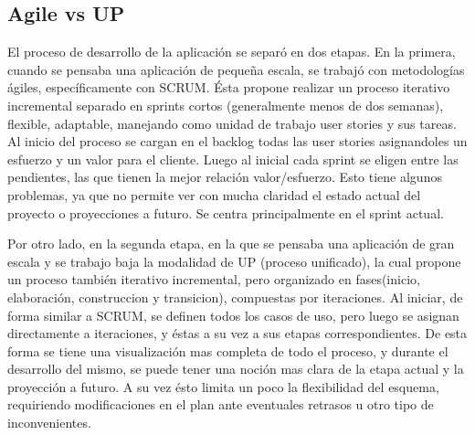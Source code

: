 \subsection{Agile vs UP}

El proceso de desarrollo de la aplicaci\'on se separ\'o en dos etapas. En la primera, cuando se pensaba una aplicaci\'on de peque\~na escala, se trabaj\'o con metodolog\'ias \'agiles, espec\'ificamente con SCRUM. Ésta propone realizar un proceso iterativo incremental separado en sprints cortos (generalmente menos de dos semanas), flexible, adaptable, manejando como unidad de trabajo user stories y sus tareas. Al inicio del proceso se cargan en el backlog todas las user stories asignandoles un esfuerzo y un valor para el cliente. Luego al inicial cada sprint se eligen entre las pendientes, las que tienen la mejor relaci\'on valor/esfuerzo. Esto tiene algunos problemas, ya que no permite ver con mucha claridad el estado actual del proyecto o proyecciones a futuro. Se centra principalmente en el sprint actual.

Por otro lado, en la segunda etapa, en la que se pensaba una aplicaci\'on de gran escala y se trabajo baja la modalidad de UP (proceso unificado), la cual propone un proceso tambi\'en iterativo incremental, pero organizado en fases(inicio, elaboraci\'on, construccion y transicion), compuestas por iteraciones. Al iniciar, de forma similar a SCRUM, se definen todos los casos de uso, pero luego se asignan directamente a iteraciones, y \'estas a su vez a sus etapas correspondientes. De esta forma se tiene una visualizaci\'on mas completa de todo el proceso, y durante el desarrollo del mismo, se puede tener una noci\'on mas clara de la etapa actual y la proyecci\'on a futuro. A su vez \'esto limita un poco la flexibilidad del esquema, requiriendo modificaciones en el plan ante eventuales retrasos u otro tipo de inconvenientes.